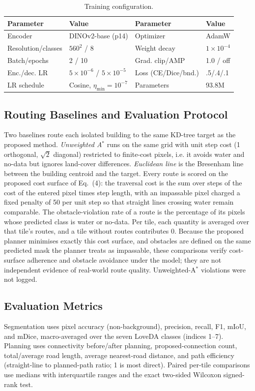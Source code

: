 \documentclass[runningheads]{llncs}
\begin{document}
\begin{table}[t]
\caption{Training configuration.}\label{tab:train}
\centering
\begin{tabular}{llll}
\toprule
Parameter & Value & Parameter & Value\\
\midrule
Encoder & DINOv2-base (p14) & Optimizer & AdamW\\
Resolution/classes & $560^2$ / 8 & Weight decay & $1\times10^{-4}$\\
Batch/epochs & 2 / 10 & Grad. clip/AMP & 1.0 / off\\
Enc./dec. LR & $5\times10^{-6}$ / $5\times10^{-5}$ & Loss (CE/Dice/bnd.) & .5/.4/.1\\
LR schedule & Cosine, $\eta_{\min}=10^{-7}$ & Parameters & 93.8M\\
\bottomrule
\end{tabular}
\end{table}

\subsection{Routing Baselines and Evaluation Protocol}\label{sec:baselines}
Two baselines route each isolated building to the same KD-tree target as the proposed method. \emph{Unweighted A$^{*}$} runs on the same grid with unit step cost (1 orthogonal, $\sqrt2$ diagonal) restricted to finite-cost pixels, i.e. it avoids water and no-data but ignores land-cover differences. \emph{Euclidean line} is the Bresenham line between the building centroid and the target. Every route is scored on the proposed cost surface of Eq.~(4): the traversal cost is the sum over steps of the cost of the entered pixel times step length, with an impassable pixel charged a fixed penalty of 50 per unit step so that straight lines crossing water remain comparable. The obstacle-violation rate of a route is the percentage of its pixels whose predicted class is water or no-data. Per tile, each quantity is averaged over that tile's routes, and a tile without routes contributes 0. Because the proposed planner minimises exactly this cost surface, and obstacles are defined on the same predicted mask the planner treats as impassable, these comparisons verify cost-surface adherence and obstacle avoidance under the model; they are not independent evidence of real-world route quality. Unweighted-A$^{*}$ violations were not logged.

\subsection{Evaluation Metrics}
Segmentation uses pixel accuracy (non-background), precision, recall, F1, mIoU, and mDice, macro-averaged over the seven LoveDA classes (indices 1--7). Planning uses connectivity before/after planning, proposed-connection count, total/average road length, average nearest-road distance, and path efficiency (straight-line to planned-path ratio; 1 is most direct). Paired per-tile comparisons use medians with interquartile ranges and the exact two-sided Wilcoxon signed-rank test.
\end{document}
